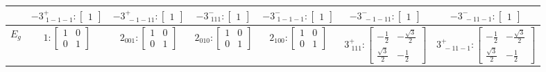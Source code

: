\documentclass[fleqn,8pt,landscape]{jsarticle}
\begin{document}
\begin{longtable}{ccccccc}
& $ -3^{+}_{\,\,1-1-1}:\begin{bmatrix} 1 \end{bmatrix} $ & $ -3^{+}_{\,\,-1-11}:\begin{bmatrix} 1 \end{bmatrix} $ & $ -3^{-}_{\,\,111}:\begin{bmatrix} 1 \end{bmatrix} $ & $ -3^{-}_{\,\,1-1-1}:\begin{bmatrix} 1 \end{bmatrix} $ & $ -3^{-}_{\,\,-1-11}:\begin{bmatrix} 1 \end{bmatrix} $ & $ -3^{-}_{\,\,-11-1}:\begin{bmatrix} 1 \end{bmatrix} $ \\ \hline
$ E_{g} $ & $ 1:\begin{bmatrix} 1 & 0 \\ 0 & 1 \end{bmatrix} $ & $ 2{}_{001}:\begin{bmatrix} 1 & 0 \\ 0 & 1 \end{bmatrix} $ & $ 2{}_{010}:\begin{bmatrix} 1 & 0 \\ 0 & 1 \end{bmatrix} $ & $ 2{}_{100}:\begin{bmatrix} 1 & 0 \\ 0 & 1 \end{bmatrix} $ & $ 3^{+}_{\,\,111}:\begin{bmatrix} - \frac{1}{2} & - \frac{\sqrt{3}}{2} \\ \frac{\sqrt{3}}{2} & - \frac{1}{2} \end{bmatrix} $ & $ 3^{+}_{\,\,-11-1}:\begin{bmatrix} - \frac{1}{2} & - \frac{\sqrt{3}}{2} \\ \frac{\sqrt{3}}{2} & - \frac{1}{2} \end{bmatrix} $ \\

\end{longtable}
\end{document}
